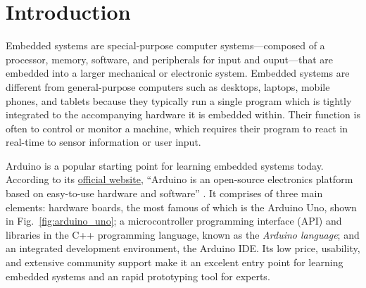 \chapter{Introduction}
Embedded systems \parencite{leveson_embedded_2003} are special-purpose computer systems---composed of a processor, memory, software, and peripherals for input and ouput---that are embedded into a larger mechanical or electronic system.
Embedded systems are different from general-purpose computers such as desktops, laptops, mobile phones, and tablets because they typically run a single program which is tightly integrated to the accompanying hardware it is embedded within.
Their function is often to control or monitor a machine, which requires their program to react in real-time to sensor information or user input.

Arduino is a popular starting point for learning embedded systems today.
According to its \href{https://www.arduino.cc/en/Guide/Introduction}{official website}, 
``Arduino is an open-source electronics platform based on easy-to-use hardware and software'' \parencite{arduino_what_2018}.
It comprises of three main elements: 
hardware boards, the most famous of which is the Arduino Uno, shown in Fig.~\ref{fig:arduino_uno};
a microcontroller programming interface (API) and libraries in the C++ programming language, known as the \emph{Arduino language};
and an integrated development environment, the Arduino IDE.
Its low price, usability, and extensive community support make it an excelent entry point for learning embedded systems and an rapid prototyping tool for experts.

